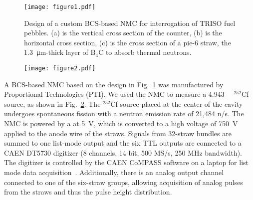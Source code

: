 \documentclass[preprint,final]{elsarticle}
\begin{document}
\begin{figure}[!htbp]
	\centering
	\texttt{[image: figure1.pdf]}
	\caption{Design of a custom BCS-based NMC for interrogation of TRISO fuel pebbles. (a) is the vertical cross section of the counter, (b) is the horizontal cross section, (c) is the cross section of a pie-6 straw, the \SI{1.3}{\micro\meter}-thick layer of $\mathrm{{B}_4C}$ to absorb thermal neutrons.}
	\label{fig:NMC_mcnp_model}
\end{figure}
\begin{figure}[!htbp]
    \centering
    \texttt{[image: figure2.pdf]}
    \caption{}
    \label{fig:cf252 measurement}
\end{figure}

A BCS-based NMC based on the design in Fig.~\ref{fig:NMC_mcnp_model} was manufactured by Proportional Technologies (PTI)\deleted{, }. We used the NMC to measure a {\SI{4.943}{\micro\Ci}} ${}^{252}$Cf source, as shown in Fig.~\ref{fig:cf252 measurement}. The ${}^{252}$Cf source placed at the center of the cavity undergoes spontaneous fission with a neutron emission rate of 21,484 n/s. The NMC is powered by a  at \SI{5}{\V}, which is converted to a high voltage of \SI{750}{\V} applied to the anode wire of the straws. Signals from 32-straw bundles are summed to one list-mode  output and the six TTL outputs are connected to a CAEN DT5730 digitizer (8 channels, 14 bit, 500 MS/s, 250 MHz bandwidth). The digitizer is controlled by the CAEN CoMPASS software on a laptop for list mode data acquisition~\cite{caencompass}. Additionally, there is an analog output channel connected to one of the six-straw groups, allowing acquisition of analog pulses from the straws and thus the pulse height distribution.
\end{document}
